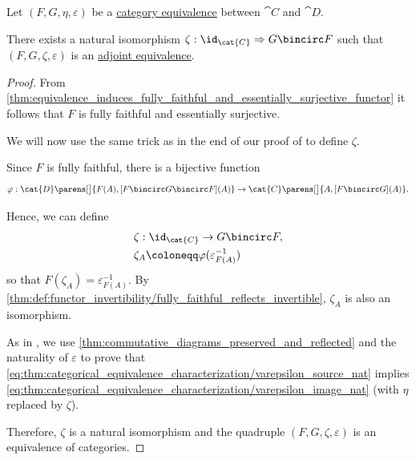 \begin{proposition}\label{thm:adjoint_equivalence}
  Let \( (F, G, \eta, \varepsilon) \) be a \hyperref[def:equivalence_of_categories]{category equivalence} between \( \cat{C} \) and \( \cat{D} \).

  There exists a natural isomorphism \( \zeta: \id_{\cat{C}} \Rightarrow G \bincirc F \) such that \( (F, G, \zeta, \varepsilon) \) is an \hyperref[def:adjoint_equivalence]{adjoint equivalence}.
\end{proposition}
\begin{proof}
  From \cref{thm:equivalence_induces_fully_faithful_and_essentially_surjective_functor} it follows that \( F \) is fully faithful and essentially surjective.

  We will now use the same trick as in the end of our proof of  to define \( \zeta \).

  Since \( F \) is fully faithful, there is a bijective function
  \begin{equation*}
    \varphi: \cat{D}\parens[\big]{ F(A), [F \bincirc G \bincirc F](A) } \to \cat{C}\parens[\big]{ A, [F \bincirc G](A) }.
  \end{equation*}

  Hence, we can define
  \begin{equation*}
    \begin{aligned}
      &\zeta: \id_{\cat{C}} \to G \bincirc F, \\
      &\zeta_A \coloneqq \varphi(\varepsilon_{F(A)}^{-1})
    \end{aligned}
  \end{equation*}
  so that \( F(\zeta_A) = \varepsilon_{F(A)}^{-1} \). By \cref{thm:def:functor_invertibility/fully_faithful_reflects_invertible}, \( \zeta_A \) is also an isomorphism.

  As in , we use \cref{thm:commutative_diagrams_preserved_and_reflected} and the naturality of \( \varepsilon \) to prove that \eqref{eq:thm:categorical_equivalence_characterization/varepsilon_source_nat} implies \eqref{eq:thm:categorical_equivalence_characterization/varepsilon_image_nat} (with \( \eta \) replaced by \( \zeta \)).

  Therefore, \( \zeta \) is a natural isomorphism and the quadruple \( (F, G, \zeta, \varepsilon) \) is an equivalence of categories.
\end{proof}

